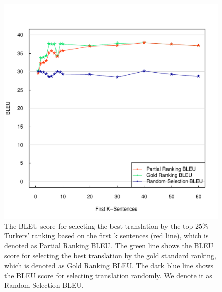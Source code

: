 \documentclass[11pt]{article}
\begin{document}
\begin{figure}[h!]
  \centering
  \includegraphics[width=\linewidth]{senlevelselect/curve1.pdf}
  \caption{ The BLEU score for selecting the  best translation by the top 25\% Turkers' ranking based on the first k sentences (red line), which is denoted as Partial Ranking BLEU. The green line shows the BLEU score for selecting the best translation by the gold standard ranking, which is denoted as Gold Ranking BLEU. The dark blue line shows the BLEU score for selecting translation randomly. We denote it as Random Selection BLEU.}
    \label{firstksenbleu}
\end{figure}
\end{document}
